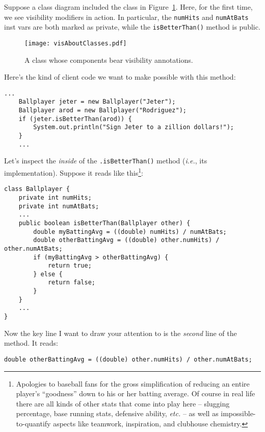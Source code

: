 Suppose a class diagram included the class in
Figure~\ref{fig:visAboutClasses}. Here, for the first time, we see visibility
modifiers in action. In particular, the \texttt{numHits} and
\texttt{numAtBats} inst vars are both marked as private, while the
\texttt{isBetterThan()} method is public.

\begin{figure}[ht]
\centering
\texttt{[image: visAboutClasses.pdf]}
\caption{A class whose components bear visibility annotations.}
\label{fig:visAboutClasses}
\end{figure}

Here's the kind of client code we want to make possible with this method:

\begin{Verbatim}[fontsize=\small,samepage=true,frame=single]
    ...
    Ballplayer jeter = new Ballplayer("Jeter");
    Ballplayer arod = new Ballplayer("Rodriguez");
    if (jeter.isBetterThan(arod)) {
        System.out.println("Sign Jeter to a zillion dollars!");
    }
    ...
\end{Verbatim}

Let's inspect the \textit{inside} of the \texttt{.isBetterThan()} method
(\textit{i.e.}, its implementation). Suppose it reads like
this\footnote{Apologies to baseball fans for the gross simplification of
reducing an entire player's ``goodness'' down to his or her batting average. Of
course in real life there are all kinds of other stats that come into play
here -- slugging percentage, base running stats, defensive ability,
\textit{etc.} -- as well as impossible-to-quantify aspects like teamwork,
inspiration, and clubhouse chemistry.}:

\begin{Verbatim}[fontsize=\footnotesize,samepage=true,frame=single]
class Ballplayer {
    private int numHits;
    private int numAtBats;
    ...
    public boolean isBetterThan(Ballplayer other) {
        double myBattingAvg = ((double) numHits) / numAtBats;
        double otherBattingAvg = ((double) other.numHits) / other.numAtBats;
        if (myBattingAvg > otherBattingAvg) {
            return true;
        } else {
            return false;
        }
    }
    ...
}
\end{Verbatim}

Now the key line I want to draw your attention to is the \textit{second} line
of the method. It reads:

\begin{verbatim}
double otherBattingAvg = ((double) other.numHits) / other.numAtBats;
\end{verbatim}

